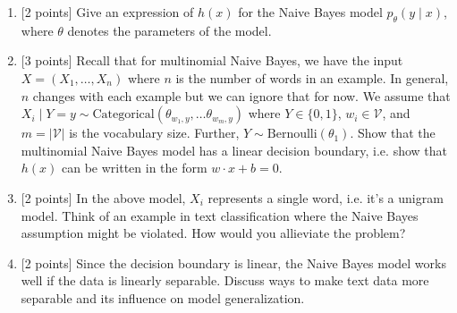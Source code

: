 \documentclass{article}
\theoremstyle{case}
\theoremstyle{definition}
\newcommand{\recall}[1]{\noindent{[\textbf{RECALL:} #1]}}
\begin{document}
\begin{enumerate}
    \item {[2 points]} Give an expression of $h(x)$ for the Naive Bayes model $p_\theta(y\mid x)$, where $\theta$ denotes the parameters of the model.

    \newpage
\item {[3 points]} Recall that for multinomial Naive Bayes,
        we have the input $X=(X_1, \ldots, X_n)$ where $n$ is the number of words in an example.
        In general, $n$ changes with each example but we can ignore that for now.
        We assume that $X_i\mid Y=y \sim \text{Categorical}(\theta_{w_1,y}, \ldots \theta_{w_m,y})$ where $Y\in \{0, 1\}$, $w_i\in\mathcal{V}$, and $m=|\mathcal{V}|$ is the vocabulary size.
        Further, $Y\sim\text{Bernoulli}(\theta_1)$.
        Show that the multinomial Naive Bayes model has a linear decision boundary,
        i.e. show that $h(x)$ can be written in the form $w\cdot x + b=0$.
        \recall{
            The categorical distribution is a multinomial distribution with one trial.
            Its PMF is
            $$
            p(x_1,\ldots, x_m) = \prod_{i=1}^m\theta_{i}^{x_i} \;,
            $$
            where $x_i = \mathbbm{1}[x=i]$, $\sum_{i=1}^m x_i = 1$,
            and $\sum_{i=1}^m \theta_i = 1$.
        }
    
    \newpage
\item {[2 points]} In the above model, $X_i$ represents a single word, i.e. it's a unigram model.
    Think of an example in text classification where the Naive Bayes assumption might be violated.
    How would you allieviate the problem?

\item {[2 points]} Since the decision boundary is linear, the Naive Bayes model works well if the data is linearly separable.
        Discuss ways to make text data more separable and its influence on model generalization.

\newpage
\end{enumerate}
\end{document}
